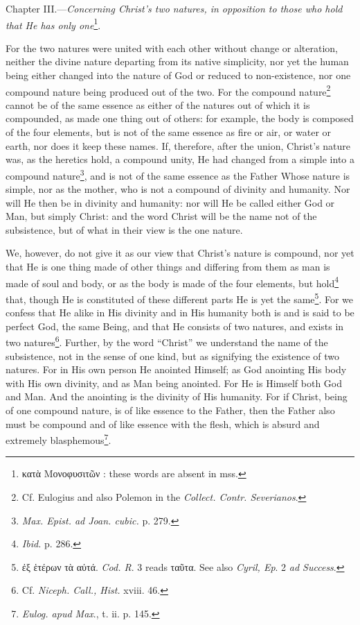 
Chapter III.—\emph{Concerning Christ’s two natures, in opposition to those who hold that He has only one}\footnote{\textgreek{κατὰ Μονοφυσιτῶν} : these words are absent in mss.}.

For the two natures were united with each other without change or alteration, neither the divine nature departing from its native simplicity, nor yet the human being either changed into the nature of God or reduced to non-existence, nor one compound nature being produced out of the two. For the compound nature\footnote{Cf. Eulogius and also Polemon in the \emph{Collect. Contr. Severianos}.} cannot be of the same essence as either of the natures out of which it is compounded, as made one thing out of others: for example, the body is composed of the four elements, but is not of the same essence as fire or air, or water or earth, nor does it keep these names. If, therefore, after the union, Christ’s nature was, as the heretics hold, a compound unity, He had changed from a simple into a compound nature\footnote{\emph{Max. Epist. ad Joan. cubic. }p. 279.}, and is not of the same essence as the Father Whose nature is simple, nor as the mother, who is not a compound of divinity and humanity. Nor will He then be in divinity and humanity: nor will He be called either God or Man, but simply Christ: and the word Christ will be the name not of the subsistence, but of what in their view is the one nature.

We, however, do not give it as our view that Christ’s nature is compound, nor yet that He is one thing made of other things and differing from them as man is made of soul and body, or as the body is made of the four elements, but hold\footnote{\emph{Ibid. }p. 286.} that, though He is constituted of these different parts He is yet the same\footnote{\textgreek{ἐξ ἑτέρων τὰ αὐτά}. \emph{Cod. R}. 3 reads \textgreek{ταῦτα}. See also \emph{Cyril, Ep}. 2 \emph{ad Success}.}. For we confess that He alike in His divinity and in His humanity both is and is said to be perfect God, the same Being, and that He consists of two natures, and exists in two natures\footnote{Cf. \emph{Niceph. Call., Hist. }xviii. 46.}. Further, by the word “Christ” we understand the name of the subsistence, not in the sense of one kind, but as signifying the existence of two natures. For in His own person He anointed Himself; as God anointing His body with His own divinity, and as Man being anointed. For He is Himself both God and Man. And the anointing is the divinity of His humanity. For if Christ, being of one compound nature, is of like essence to the Father, then the Father also must be compound and of like essence with the flesh, which is absurd and extremely blasphemous\footnote{\emph{Eulog. apud Max}., t. ii. p. 145.}.

